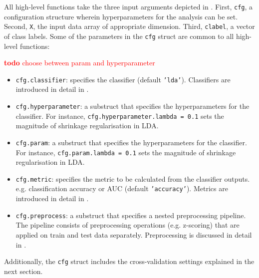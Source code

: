 \documentclass[utf8]{frontiersSCNS} %
\newcommand{\ttt}[1]{\texttt{#1}}
\newcommand{\todo}[1]{\textcolor{red}{\textbf{todo} #1}}
\begin{document}
All high-level functions take the three input arguments depicted in . First, \ttt{cfg}, a configuration structure wherein hyperparameters for the analysis can be set. Second, \ttt{X}, the input data array of appropriate dimension. Third, \ttt{clabel}, a vector of class labels.
Some of the parameters in the \ttt{cfg} struct are common  to all high-level functions:

\todo{choose between param and hyperparameter}

\begin{itemize}
    \item \ttt{cfg.classifier}: specifies the classifier (default \ttt{'lda'}). Classifiers are introduced in detail in .
    \item \ttt{cfg.hyperparameter}: a substruct that specifies the hyperparameters for the classifier. For instance, \ttt{cfg.hyperparameter.lambda = 0.1} sets the magnitude of shrinkage regularisation in LDA.
    \item \ttt{cfg.param}: a substruct that specifies the hyperparameters for the classifier. For instance, \ttt{cfg.param.lambda = 0.1} sets the magnitude of shrinkage regularisation in LDA.
    \item \ttt{cfg.metric}: specifies the metric to be calculated from the classifier outputs. e.g. classification accuracy or AUC (default \ttt{'accuracy'}). Metrics are introduced in detail in .
    \item \ttt{cfg.preprocess}: a substruct that specifies a nested preprocessing pipeline. The pipeline consists of preprocessing operations (e.g. z-scoring) that are applied on train and test data separately. Preprocessing is discussed in detail in .
\end{itemize}

Additionally, the \ttt{cfg} struct includes the cross-validation settings explained in the next section.

\end{document}
